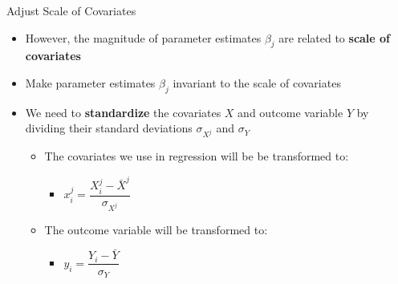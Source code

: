 \documentclass[hyperref={pdfpagelabels=false}]{beamer}
\begin{document}
\begin{frame}{Adjust Scale of Covariates}{}
	\begin{itemize}
		
		\item However, the magnitude of parameter estimates $\beta_{j}$ are related to \textbf{scale of covariates}
		\vspace{0.2cm}
		\item Make parameter estimates $\beta_{j}$ invariant to the scale of covariates
		\vspace{0.2cm}
		\item We need to \textbf{standardize} the covariates $X$ and outcome variable $Y$ by dividing their standard deviations $\sigma_{X^{j}}$ and $\sigma_{Y}$
		\vspace{0.2cm}
		\begin{itemize}
			\item The covariates we use in regression will be be transformed to: 
			\vspace{0.2cm} 
			\begin{itemize}
				\item $x^{j}_{i} = \dfrac{X^{j}_{i}-\bar{X}^{j}}{\sigma_{X^{j}}}$
			\end{itemize}
			\vspace{0.2cm} 
			\item The outcome variable will be transformed to: 
			\vspace{0.2cm} 
			\begin{itemize}
				\item $y_{i} = \dfrac{Y_{i}-\bar{Y}}{\sigma_{Y}}$
			\end{itemize}
			
		\end{itemize}
	\end{itemize}
\end{frame}
\end{document}
